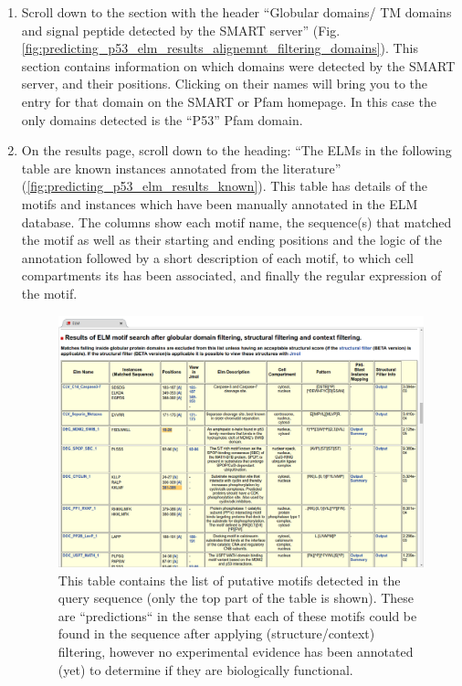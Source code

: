 \documentclass[12pt]{article}
\begin{document}
\begin{enumerate}
\item Scroll down to the section with the header ``Globular domains/ TM domains
	and signal peptide detected by the SMART server''
	(Fig. \ref{fig:predicting_p53_elm_results_alignemnt_filtering_domains}).
	This section contains information on which domains were detected by the
	SMART server, and their positions. Clicking on their names will bring
	you to the entry for that domain on the SMART or Pfam homepage.
	In this case the only domains detected is the ``P53'' Pfam domain.

\item On the results page, scroll down to the heading: ``The ELMs in the
	following table are known instances annotated from the literature''
	(\ref{fig:predicting_p53_elm_results_known}).
	This table has details of the motifs and instances which have been
	manually annotated in the ELM database. The columns show each motif
	name, the sequence(s) that matched the motif as well as their starting
	and ending positions and the logic of the annotation followed by a
	short description of each motif, to which cell compartments its has
	been associated, and finally the regular expression of the motif.

\begin{figure}[h!]
	\centering
	\includegraphics[width=\textwidth]{Figures/predicting_p53/elm_results_motifs.png}
	\caption{
	This table contains the list of putative motifs detected in the query sequence (only
	the top part of the table is shown). These are ``predictions`` in the sense
	that each of these motifs could be found in the sequence after applying (structure/context) filtering, however no experimental evidence has been annotated (yet) to determine if they are biologically functional.
	}
	\label{fig:predicting_p53_elm_results_motifs}
\end{figure}


\end{enumerate}
\end{document}
